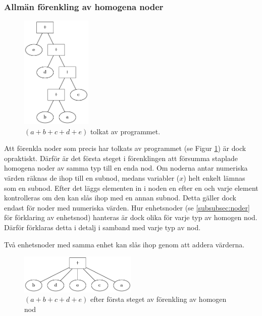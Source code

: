 \documentclass[12pt,a4paper]{article}
\begin{document}
\subsubsection{Allmän förenkling av homogena noder}
\label{subsubsec:förenkling_homogena}
\begin{figure}[h!]
  \centering
  \includegraphics[width=0.3\textwidth]{image22}
  \caption{\((a + b + c + d + e)\) tolkat av programmet.}
  \label{fig:2311}
\end{figure}
Att förenkla noder som precis har tolkats av programmet (se Figur \ref{fig:2311}) är dock opraktiskt. Därför är det första steget i förenklingen att försumma staplade homogena noder av samma typ till en enda nod. Om noderna antar numeriska värden räknas de ihop till en subnod, medans variabler (\(x\)) helt enkelt lämnas som en subnod. Efter det läggs elementen in i noden en efter en och varje element kontrolleras om den kan slås ihop med en annan subnod. Detta gäller dock endast för noder med numeriska värden. Hur enhetsnoder (se \ref{subsubsec:noder} för förklaring av enhetsnod) hanteras är dock olika för varje typ av homogen nod. Därför förklaras detta i detalj i samband med varje typ av nod.\par
Två enhetsnoder med samma enhet kan slås ihop genom att addera värderna.
\begin{figure}[h!]
  \centering
  \includegraphics[width=0.5\textwidth]{image16}
  \caption{\((a + b + c + d + e)\) efter första steget av förenkling av homogen nod}
  \label{fig:2312}
\end{figure}
\end{document}
